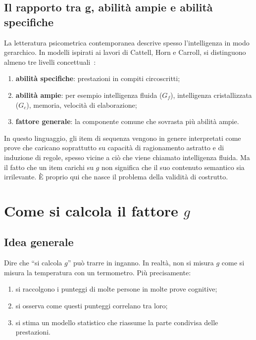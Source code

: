 \documentclass[10pt, a4paper]{article}
\theoremstyle{plain}
\theoremstyle{definition}
\theoremstyle{remark}
\begin{document}
\subsection{Il rapporto tra g, abilità ampie e abilità specifiche}

La letteratura psicometrica contemporanea descrive spesso l'intelligenza in modo
gerarchico. In modelli ispirati ai lavori di Cattell, Horn e Carroll, si
distinguono almeno tre livelli concettuali~\cite{cattell1963, carroll1993}:
\begin{enumerate}[label=\arabic*.]
    \item \textbf{abilità specifiche}:
          prestazioni in compiti circoscritti;
    \item \textbf{abilità ampie}:
          per esempio intelligenza fluida ($G_f$), intelligenza cristallizzata
          ($G_c$), memoria, velocità di elaborazione;
    \item \textbf{fattore generale}:
          la componente comune che sovrasta più abilità ampie.
\end{enumerate}

In questo linguaggio, gli item di sequenza vengono in genere interpretati come
prove che caricano soprattutto su capacità di ragionamento astratto e di
induzione di regole, spesso vicine a ciò che viene chiamato intelligenza
fluida. Ma il fatto che un item carichi su $g$ non significa che il suo
contenuto semantico sia irrilevante. È proprio qui che nasce il problema della
validità di costrutto.

\section{Come si calcola il fattore \texorpdfstring{$g$}{g}}
\label{sec:gcalc}

\subsection{Idea generale}

Dire che ``si calcola $g$'' può trarre in inganno. In realtà, non si misura
$g$ come si misura la temperatura con un termometro. Più precisamente:
\begin{enumerate}[label=\arabic*.]
    \item si raccolgono i punteggi di molte persone in molte prove cognitive;
    \item si osserva come questi punteggi correlano tra loro;
    \item si stima un modello statistico che riassume la parte condivisa delle
          prestazioni.
\end{enumerate}
\end{document}
